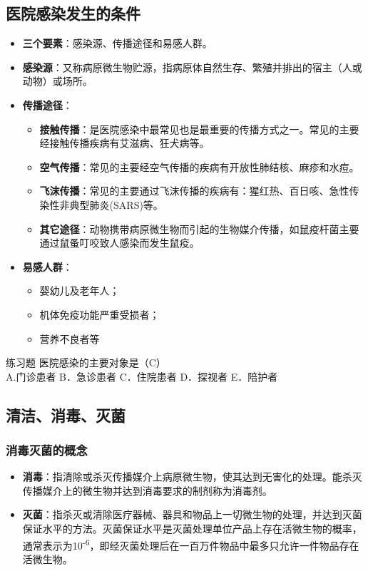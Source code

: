 \documentclass[11pt, a4paper]{ctexart}
\begin{document}
\subsection{医院感染发生的条件}
\begin{itemize}
    \item \textbf{三个要素}：感染源、传播途径和易感人群。
    \item \textbf{感染源}：又称病原微生物贮源，指病原体自然生存、繁殖并排出的宿主（人或动物）或场所。
    \item \textbf{传播途径}：
    \begin{itemize}
        \item \textbf{接触传播}：是医院感染中最常见也是最重要的传播方式之一。常见的主要经接触传播疾病有艾滋病、狂犬病等。
        \item \textbf{空气传播}：常见的主要经空气传播的疾病有开放性肺结核、麻疹和水痘。
        \item \textbf{飞沫传播}：常见的主要通过飞沫传播的疾病有：猩红热、百日咳、急性传染性非典型肺炎(SARS)等。
        \item \textbf{其它途径}：动物携带病原微生物而引起的生物媒介传播，如鼠疫杆菌主要通过鼠蚤叮咬致人感染而发生鼠疫。
    \end{itemize}
    \item \textbf{易感人群}：
    \begin{itemize}
        \item 婴幼儿及老年人；
        \item 机体免疫功能严重受损者；
        \item 营养不良者等
    \end{itemize}
\end{itemize}

\begin{examplebox}{练习题}
医院感染的主要对象是（C）\\
A.门诊患者 \quad B．急诊患者 \quad C．住院患者 \quad D．探视者 \quad E．陪护者
\end{examplebox}

\subsection{清洁、消毒、灭菌}
\subsubsection{消毒灭菌的概念}
\begin{itemize}
    \item \textbf{消毒}：指清除或杀灭传播媒介上病原微生物，使其达到无害化的处理。能杀灭传播媒介上的微生物并达到消毒要求的制剂称为消毒剂。
    \item \textbf{灭菌}：指杀灭或清除医疗器械、器具和物品上一切微生物的处理，并达到灭菌保证水平的方法。灭菌保证水平是灭菌处理单位产品上存在活微生物的概率，通常表示为10\textsuperscript{-6}，即经灭菌处理后在一百万件物品中最多只允许一件物品存在活微生物。
\end{itemize}
\end{document}
